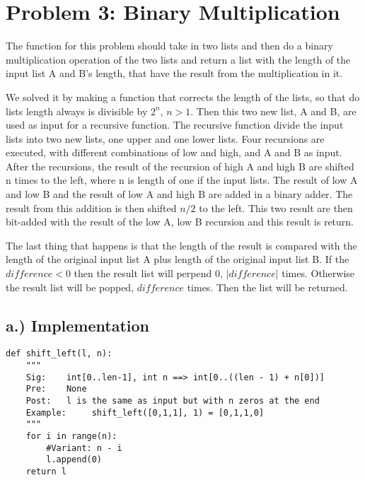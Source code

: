 \documentclass{article}
\begin{document}
\section*{Problem 3: Binary Multiplication}
The function for this problem should take in two lists and then do a binary multiplication operation of the two lists and return a list with the length of the input list A and B's length, that have the result from the multiplication in it. 

We solved it by making a function that corrects the length of the lists, so that do lists length always is divisible by $2^n$, $n>1$. Then this two new list, A and B, are used as input for a recursive function. The recursive function divide the input lists into two new lists, one upper and one lower lists. Four recursions are executed, with different combinations of low and high, and A and B as input. After the recursions, the result of the recursion of high A and high B are shifted n times to the left, where n is length of one if the input lists. The result of low A and low B and the result of low A and high B are added in a binary adder. The result from this addition is then shifted $n/2$ to the left. This two result are then bit-added with the result of the low A, low B recursion and this result is return. 

The last thing that happens is that the length of the result is compared with the length of the original input list A plus length of the original input list B. If the $difference<0$ then the result list will perpend 0, $|difference|$ times. Otherwise the result list will be popped, $difference$ times. Then the list will be returned.

\newpage
\subsection*{a.) Implementation}
\begin{lstlisting}[caption={Code for Shift Left function},captionpos=b]
def shift_left(l, n):
    """
    Sig:    int[0..len-1], int n ==> int[0..((len - 1) + n[0])]
    Pre:    None
    Post:   l is the same as input but with n zeros at the end 
    Example:     shift_left([0,1,1], 1) = [0,1,1,0]
    """
    for i in range(n):
        #Variant: n - i
        l.append(0)
    return l
\end{lstlisting}
\end{document}
